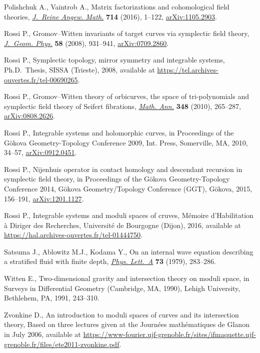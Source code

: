 \documentclass[pdftex]{sigma}
\numberwithin{equation}{section}
\newcommand{\<}{\left<}
\renewcommand{\>}{\right>}
\begin{document}
\begin{thebibliography}{99}
Polishchuk A., Vaintrob A., Matrix factorizations and cohomological f\/ield
 theories, \href{https://doi.org/10.1515/crelle-2014-0024}{\textit{J.~Reine Angew. Math.}} \textbf{714} (2016), 1--122,
 \href{https://arxiv.org/abs/1105.2903}{arXiv:1105.2903}.

Rossi P., Gromov--{W}itten invariants of target curves via symplectic f\/ield
 theory, \href{https://doi.org/10.1016/j.geomphys.2008.02.012}{\textit{J.~Geom. Phys.}} \textbf{58} (2008), 931--941,
 \href{https://arxiv.org/abs/0709.2860}{arXiv:0709.2860}.

Rossi P., Symplectic topology, mirror symmetry and integrable systems, Ph.D.~Thesis, {SISSA} ({T}rieste), 2008, available at
 \url{https://tel.archives-ouvertes.fr/tel-00690265}.

Rossi P., Gromov--{W}itten theory of orbicurves, the space of tri-polynomials
 and symplectic f\/ield theory of {S}eifert f\/ibrations, \href{https://doi.org/10.1007/s00208-009-0471-0}{\textit{Math. Ann.}}
 \textbf{348} (2010), 265--287, \href{https://arxiv.org/abs/0808.2626}{arXiv:0808.2626}.

Rossi P., Integrable systems and holomorphic curves, in Proceedings of the
 {G}\"okova {G}eometry-{T}opology {C}onference 2009, Int. Press, Somerville,
 MA, 2010, 34--57, \href{https://arxiv.org/abs/0912.0451}{arXiv:0912.0451}.

Rossi P., Nijenhuis operator in contact homology and descendant recursion in
 symplectic f\/ield theory, in Proceedings of the {G}\"okova
 {G}eometry-{T}opology {C}onference 2014, G\"okova Geometry/Topology
 Conference (GGT), G\"okova, 2015, 156--191, \href{https://arxiv.org/abs/1201.1127}{arXiv:1201.1127}.

Rossi P., Integrable systems and moduli spaces of cruves, M\'emoire
 d'Habilitation \`a Diriger des Recherches, Universit\'e de Bourgogne (Dijon),
 2016, available at \url{https://hal.archives-ouvertes.fr/tel-01444750}.

Satsuma J., Ablowitz M.J., Kodama Y., On an internal wave equation describing a
 stratif\/ied f\/luid with f\/inite depth, \href{https://doi.org/10.1016/0375-9601(79)90534-6}{\textit{Phys. Lett.~A}} \textbf{73}
 (1979), 283--286.

Witten E., Two-dimensional gravity and intersection theory on moduli space, in
 Surveys in Dif\/ferential Geometry ({C}ambridge, {MA}, 1990), Lehigh
 University, Bethlehem, PA, 1991, 243--310.

Zvonkine D., An introduction to moduli spaces of curves and its intersection
 theory, {B}ased on three lectures given at the Journ\'ees math\'ematiques de
 Glanon in July 2006, available at
 \url{https://www-fourier.ujf-grenoble.fr/sites/ifmaquette.ujf-grenoble.fr/files/ete2011-zvonkine.pdf}.

\end{thebibliography}\LastPageEnding
\end{document}
